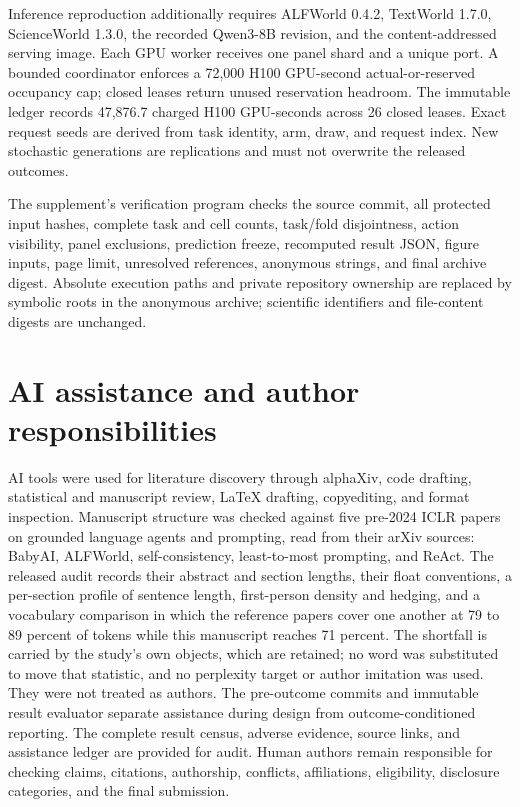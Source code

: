 Inference reproduction additionally requires ALFWorld 0.4.2, TextWorld 1.7.0, ScienceWorld 1.3.0, the recorded Qwen3-8B revision, and the content-addressed serving image. Each GPU worker receives one panel shard and a unique port. A bounded coordinator enforces a 72,000 H100 GPU-second actual-or-reserved occupancy cap; closed leases return unused reservation headroom. The immutable ledger records 47,876.7 charged H100 GPU-seconds across 26 closed leases. Exact request seeds are derived from task identity, arm, draw, and request index. New stochastic generations are replications and must not overwrite the released outcomes.

The supplement's verification program checks the source commit, all protected input hashes, complete task and cell counts, task/fold disjointness, action visibility, panel exclusions, prediction freeze, recomputed result JSON, figure inputs, page limit, unresolved references, anonymous strings, and final archive digest. Absolute execution paths and private repository ownership are replaced by symbolic roots in the anonymous archive; scientific identifiers and file-content digests are unchanged.

\section{AI assistance and author responsibilities}
\label{app:ai}

AI tools were used for literature discovery through alphaXiv, code drafting, statistical and manuscript review, LaTeX drafting, copyediting, and format inspection. Manuscript structure was checked against five pre-2024 ICLR papers on grounded language agents and prompting, read from their arXiv sources: BabyAI, ALFWorld, self-consistency, least-to-most prompting, and ReAct. The released audit records their abstract and section lengths, their float conventions, a per-section profile of sentence length, first-person density and hedging, and a vocabulary comparison in which the reference papers cover one another at 79 to 89 percent of tokens while this manuscript reaches 71 percent. The shortfall is carried by the study's own objects, which are retained; no word was substituted to move that statistic, and no perplexity target or author imitation was used. They were not treated as authors. The pre-outcome commits and immutable result evaluator separate assistance during design from outcome-conditioned reporting. The complete result census, adverse evidence, source links, and assistance ledger are provided for audit. Human authors remain responsible for checking claims, citations, authorship, conflicts, affiliations, eligibility, disclosure categories, and the final submission.



